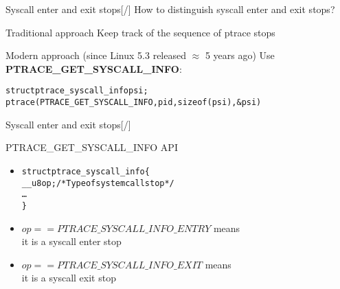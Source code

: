 \documentclass[unicode,aspectratio=169,xcolor={table,dvipsnames,usernames}]{beamer}
\begin{document}
\begin{frame}[fragile]{\Large Syscall enter and exit stops\hfill [\insertframenumber/\inserttotalframenumber]}
\Large
How to distinguish syscall enter and exit stops?
\begin{block}{Traditional approach}
	Keep track of the sequence of ptrace stops
\end{block}

\begin{block}{Modern approach (since Linux 5.3 released $\approx$ 5 years ago)}
	Use \textbf{PTRACE\_GET\_SYSCALL\_INFO}:
	\begin{alltt}
		struct ptrace_syscall_info psi;
		ptrace(PTRACE_GET_SYSCALL_INFO, pid, sizeof(psi), &psi)
	\end{alltt}
\end{block}
\end{frame}

\begin{frame}[fragile]{\Large Syscall enter and exit stops\hfill [\insertframenumber/\inserttotalframenumber]}
\Large
\begin{block}{PTRACE\_GET\_SYSCALL\_INFO API}
\begin{itemize}
	\item \begin{alltt}
	struct ptrace_syscall_info \{
	  __u8 op;	\hfill /* Type of system call stop */
	  \ldots
	\}
	\end{alltt}
	\item $op == PTRACE\_SYSCALL\_INFO\_ENTRY$ means \\
		it is a syscall enter stop
	\item $op == PTRACE\_SYSCALL\_INFO\_EXIT$ means \\
		it is a syscall exit stop
\end{itemize}
\end{block}
\end{frame}
\end{document}
